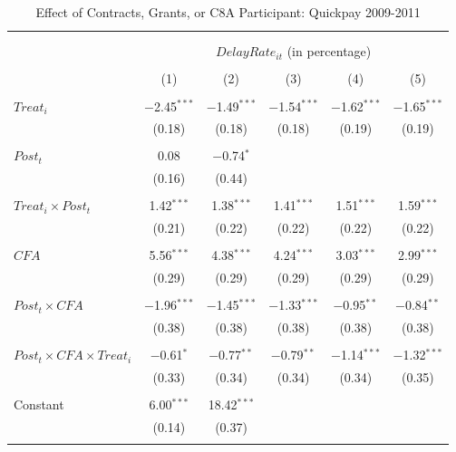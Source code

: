 \documentclass[
]{article}
\begin{document}
\begin{table}[H] \centering 
  \caption{Effect of Contracts, Grants, or C8A Participant: Quickpay 2009-2011} 
  \label{} 
\small 
\begin{tabular}{@{\extracolsep{-2pt}}lccccc} 
\\[-1.8ex]\hline 
\hline \\[-1.8ex] 
\\[-1.8ex] & \multicolumn{5}{c}{$DelayRate_{it}$ (in percentage)} \\ 
\\[-1.8ex] & (1) & (2) & (3) & (4) & (5)\\ 
\hline \\[-1.8ex] 
 $Treat_i$ & $-$2.45$^{***}$ & $-$1.49$^{***}$ & $-$1.54$^{***}$ & $-$1.62$^{***}$ & $-$1.65$^{***}$ \\ 
  & (0.18) & (0.18) & (0.18) & (0.19) & (0.19) \\ 
  & & & & & \\ 
 $Post_t$ & 0.08 & $-$0.74$^{*}$ &  &  &  \\ 
  & (0.16) & (0.44) &  &  &  \\ 
  & & & & & \\ 
 $Treat_i \times Post_t$ & 1.42$^{***}$ & 1.38$^{***}$ & 1.41$^{***}$ & 1.51$^{***}$ & 1.59$^{***}$ \\ 
  & (0.21) & (0.22) & (0.22) & (0.22) & (0.22) \\ 
  & & & & & \\ 
 $CFA$ & 5.56$^{***}$ & 4.38$^{***}$ & 4.24$^{***}$ & 3.03$^{***}$ & 2.99$^{***}$ \\ 
  & (0.29) & (0.29) & (0.29) & (0.29) & (0.29) \\ 
  & & & & & \\ 
 $Post_t \times CFA$ & $-$1.96$^{***}$ & $-$1.45$^{***}$ & $-$1.33$^{***}$ & $-$0.95$^{**}$ & $-$0.84$^{**}$ \\ 
  & (0.38) & (0.38) & (0.38) & (0.38) & (0.38) \\ 
  & & & & & \\ 
 $Post_t \times CFA \times Treat_i$ & $-$0.61$^{*}$ & $-$0.77$^{**}$ & $-$0.79$^{**}$ & $-$1.14$^{***}$ & $-$1.32$^{***}$ \\ 
  & (0.33) & (0.34) & (0.34) & (0.34) & (0.35) \\ 
  & & & & & \\ 
 Constant & 6.00$^{***}$ & 18.42$^{***}$ &  &  &  \\ 
  & (0.14) & (0.37) &  &  &  \\ 
  & & & & & \\ 

\end{tabular}
\end{table}
\end{document}
